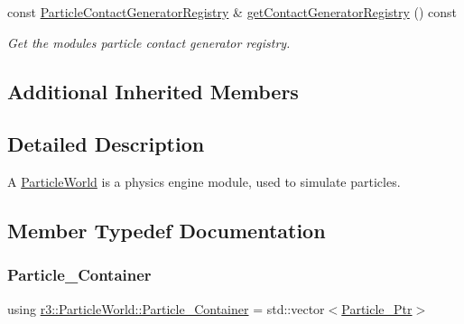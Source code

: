 \begin{DoxyCompactItemize}
const \mbox{\hyperlink{classr3_1_1_particle_contact_generator_registry}{Particle\+Contact\+Generator\+Registry}} \& \mbox{\hyperlink{classr3_1_1_particle_world_ab5cd3adaed73294927de72f3293b0709}{get\+Contact\+Generator\+Registry}} () const
\begin{DoxyCompactList}\small\item\em Get the module\textquotesingle{}s particle contact generator registry. \end{DoxyCompactList}\end{DoxyCompactItemize}
\subsection*{Additional Inherited Members}


\subsection{Detailed Description}
A \mbox{\hyperlink{classr3_1_1_particle_world}{Particle\+World}} is a physics engine module, used to simulate particles. 

\subsection{Member Typedef Documentation}
\mbox{\label{classr3_1_1_particle_world_aa354f6786c0837674fe8286f00465631}} 
\subsubsection{\texorpdfstring{Particle\+\_\+\+Container}{Particle\_Container}}
{\footnotesize\ttfamily using \mbox{\hyperlink{classr3_1_1_particle_world_aa354f6786c0837674fe8286f00465631}{r3\+::\+Particle\+World\+::\+Particle\+\_\+\+Container}} =  std\+::vector$<$\mbox{\hyperlink{classr3_1_1_particle_world_a12b4624a202a6b22629a3328f083ac81}{Particle\+\_\+\+Ptr}}$>$}

\mbox{\label{classr3_1_1_particle_world_a12b4624a202a6b22629a3328f083ac81}} 
